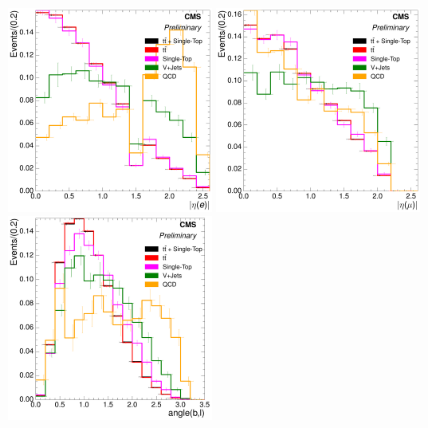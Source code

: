\begin{figure}[hbtp]
    \centering
     \includegraphics[width=0.48\textwidth]{Chapters/04_Analysis/04b_XSections/images/7TeV/fit_variables/electron/MET/electron_absolute_eta/MET_inclusive_electron_absolute_eta_2orMoreBtags_templates.pdf}\hfill
     \includegraphics[width=0.48\textwidth]{Chapters/04_Analysis/04b_XSections/images/7TeV/fit_variables/muon/MET/muon_absolute_eta/MET_inclusive_muon_absolute_eta_2orMoreBtags_templates.pdf}\\
     \includegraphics[width=0.48\textwidth]{Chapters/04_Analysis/04b_XSections/images/7TeV/fit_variables/electron/MET/angle_bl/MET_inclusive_angle_bl_2orMoreBtags_templates.pdf}\hfill

\end{figure}

